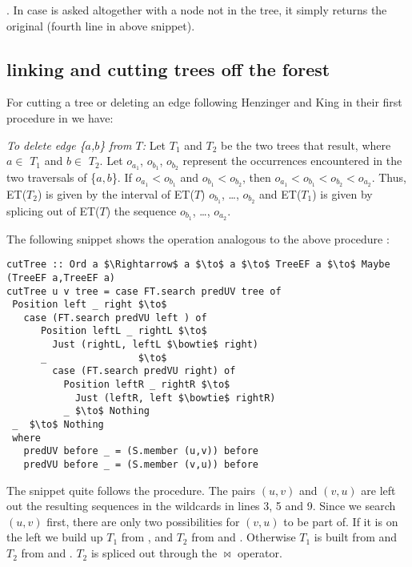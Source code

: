 . In case \reroot is asked altogether with a node not in the tree, it simply returns the original  (fourth line in above snippet).


\subsection{linking and cutting trees off the forest}

For cutting a tree or deleting an edge following Henzinger and King in their first procedure in \cite{Rand-DynGs-Algos} we have:
\begin{displayquote}
\emph{To delete edge \{$a$,$b$\} from $T$:} Let $T_1$ and $T_2$ be the two trees that result, where $a \in$ $T_1$ and $b \in$ $T_2$. Let $o_{a_1}$, $o_{b_1}$, $o_{b_2}$ represent the occurrences encountered in the two traversals of \{$a,b$\}. If $o_{a_1} < o_{b_1}$ and $o_{b_1} < o_{b_2}$, then $o_{a_1} < o_{b_1} < o_{b_2} < o_{a_2}$. Thus, ET($T_2$) is given by the interval of ET($T$) $o_{b_1}$, \ldots, $o_{b_2}$ and ET($T_1$) is given by splicing out of ET($T$) the sequence $o_{b_1}$, \ldots, $o_{a_2}$. 
\end{displayquote} 

The following snippet shows the  operation analogous to the above procedure :
\begin{lstlisting}[mathescape]
cutTree :: Ord a $\Rightarrow$ a $\to$ a $\to$ TreeEF a $\to$ Maybe (TreeEF a,TreeEF a) 
cutTree u v tree = case FT.search predUV tree of
 Position left _ right $\to$
   case (FT.search predVU left ) of
      Position leftL _ rightL $\to$  
        Just (rightL, leftL $\bowtie$ right)
      _                $\to$                    
        case (FT.search predVU right) of
          Position leftR _ rightR $\to$
            Just (leftR, left $\bowtie$ rightR)
          _ $\to$ Nothing 
 _  $\to$ Nothing  
 where
   predUV before _ = (S.member (u,v)) before 
   predVU before _ = (S.member (v,u)) before 
\end{lstlisting}

The snippet quite follows the procedure. The pairs $(u,v)$ and $(v,u)$ are left out the resulting sequences in the wildcards in lines 3, 5 and 9. Since we search $(u,v)$ first, there are only two possibilities for $(v,u)$ to be part of. If it is on the left we build up $T_1$ from , and $T_2$ from  and . Otherwise $T_1$ is built from  and $T_2$ from  and . $T_2$ is spliced out through the $\bowtie$ operator.

